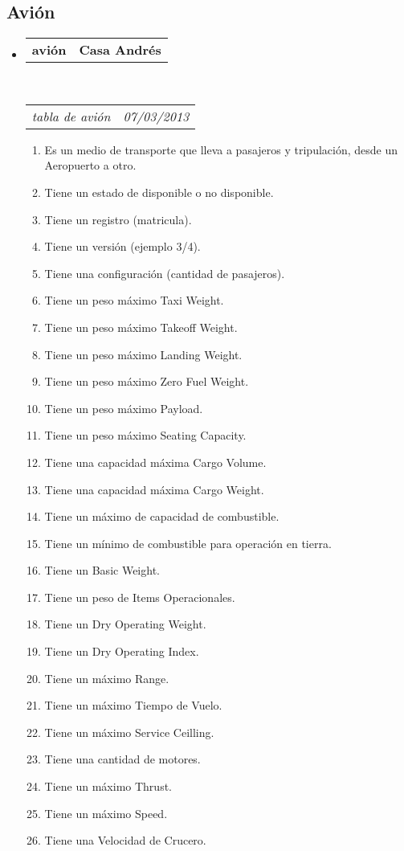 \documentclass[10pt,letterpaper]{article}
\makeatletter
\newcommand{\headerrow}[2]
{\begin{tabular*}{\linewidth}{l@{\extracolsep{\fill}}r}
	#1 &
	#2 \\
\end{tabular*}}
\makeatother
\begin{document}
\subsection*{Avión}

\begin{itemize}
	\parskip=0.1em

	\item
	\headerrow
		{\textbf{avión}}
		{\textbf{Casa Andrés}}
	\\
	\headerrow
		{\emph{tabla de avión}}
		{\emph{07/03/2013}}
	\begin{enumerate}
		\item Es un medio de transporte que lleva a pasajeros y tripulación, desde un Aeropuerto a otro.
		\item Tiene un estado de disponible o no disponible.
		\item Tiene un registro (matricula).
		\item Tiene un versión (ejemplo 3/4).
		\item Tiene una configuración (cantidad de pasajeros).
		\item Tiene un peso máximo Taxi Weight.
		\item Tiene un peso máximo Takeoff Weight.
		\item Tiene un peso máximo Landing Weight.
		\item Tiene un peso máximo Zero Fuel Weight.
		\item Tiene un peso máximo Payload.
		\item Tiene un peso máximo Seating Capacity.
		\item Tiene una capacidad máxima Cargo Volume.
		\item Tiene una capacidad máxima Cargo Weight.
		\item Tiene un máximo de capacidad de combustible.
		\item Tiene un mínimo de combustible para operación en tierra.
		\item Tiene un Basic Weight.
		\item Tiene un peso de Items Operacionales.
		\item Tiene un Dry Operating Weight.		
		\item Tiene un Dry Operating Index.
		\item Tiene un máximo Range.
		\item Tiene un máximo Tiempo de Vuelo.
		\item Tiene un máximo Service Ceilling.
		\item Tiene una cantidad de motores.
		\item Tiene un máximo Thrust.		
		\item Tiene un máximo Speed.
		\item Tiene una Velocidad de Crucero.
		
		
	\end{enumerate}

\end{itemize}
\end{document}
